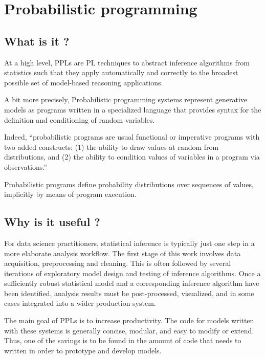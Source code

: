 \chapter{Probabilistic programming}

\section{What is it ?} \label{PPL_def}
At a high level, \glspl{PPL} are \gls{PL} techniques to abstract inference algorithms from statistics such that they apply automatically and correctly to the broadest possible set of model-based reasoning applications.

A bit more precisely, Probabilistic programming systems \cite{Goodman:2012uq,dippl,Mansinghka:2014ty,wood-aistats-2014} represent generative models as programs written in a specialized language that provides syntax for the definition and conditioning of random variables.

Indeed, ``probabilistic programs are usual functional or imperative programs with two added constructs: 
(1) the ability to draw values at random from distributions, and 
(2) the ability to condition values of variables in a program via observations.'' \cite{Gordon:2014:PP:2593882.2593900}

Probabilistic programs define probability distributions over sequences of values, implicitly by means of program execution.

\section{Why is it useful ?}
For data science practitioners, statistical inference is typically just one step in a more elaborate analysis workflow. The first stage of this work involves data acquisition, preprocessing and cleaning. This is often followed by several iterations of exploratory model design and testing of inference algorithms. Once a sufficiently robust statistical model and a corresponding inference algorithm have been identified, analysis results must be post-processed, visualized, and in some cases integrated into a wider production system.

The main goal of \glspl{PPL} is to increase productivity. 
The code for models written with these systems is generally concise, modular, and easy to modify or extend.
Thus, one of the savings is to be found in the amount of code that needs to written in order to prototype and develop models.

